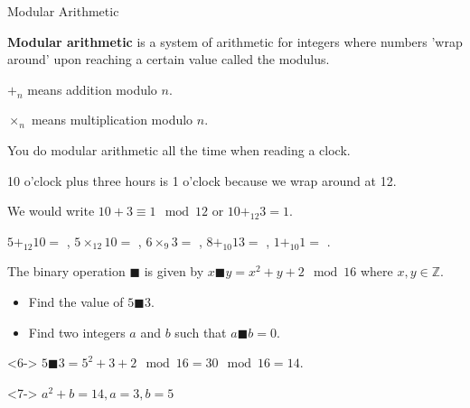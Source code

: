 \documentclass[8pt]{beamer}
\newcommand{\Z}{\mathbb{Z}}
\newcommand{\sol}[2][+]{
\tikz[baseline]{\node[color=aa,fill=cc,rectangle,draw,anchor=base] {\onslide<#1->{#2}};}
}
\begin{document}
\begin{frame}{Modular Arithmetic}
	\begin{definition}
		\textbf{Modular arithmetic} is a system of arithmetic for integers where numbers 'wrap around' upon reaching a certain value called the modulus.
	\end{definition}
	\begin{definition}
		$+_n$ means addition modulo  $n$.

		 $\times_n$ means multiplication modulo $n$.
	\end{definition}

	You do modular arithmetic all the time when reading a clock.

	10 o'clock plus three hours is 1 o'clock because we wrap around at 12.

	We would write $10+3\equiv 1 \mod 12$ or  $10 +_{12} 3 =1$.

	$5 +_{12} 10 = $\sol{$3$},  $5\times_{12} 10=$\sol{2}, $6\times_9 3=$\sol{0}, $8+_{10} 13=$\sol{1},  $1+_{10}1=$\sol{1}.

	 \begin{problem}
		 The binary operation $\blacksquare$ is given by  $x\blacksquare y=x^2+y+2 \mod 16$ where $x,y \in \Z$.
		 \begin{itemize}
		 	\item Find the value of $5\blacksquare 3$.
			\item Find two integers  $a$ and $b$ such that $a\blacksquare b=0$.
		 \end{itemize}

	\end{problem}

	\begin{solution}<6->
		$5\blacksquare 3=5^2+3+2 \mod 16 = 30 \mod 16=14$.
	\end{solution}

	\begin{solution}<7->
		$a^2+b=14, a=3, b=5$
	\end{solution}
	
\end{frame}
\end{document}
